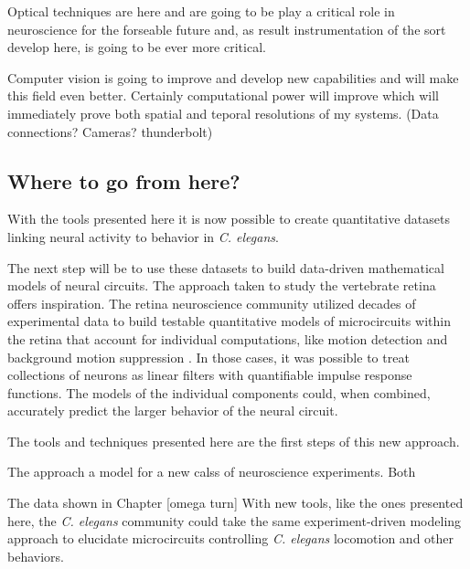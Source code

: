 Optical techniques are here and are going to be play a critical role in neuroscience for the forseable future and, as result instrumentation of the sort develop here, is going to be ever more critical. 








Computer vision is going to improve and develop new capabilities and will make this field even better. Certainly computational power will improve which will immediately prove both spatial and teporal resolutions of my systems. (Data connections? Cameras? thunderbolt)




\subsection*{Where to go from here?}
With the tools presented here it is now possible to  create  quantitative datasets linking neural activity to behavior in \textit{C. elegans}.


 The next step will be to use these datasets to  build data-driven mathematical models of neural circuits. The approach taken to study the vertebrate retina offers inspiration. The retina neuroscience community utilized decades of experimental data to  build  testable quantitative  models of microcircuits within the retina that account for individual computations, like motion detection and background motion suppression \citep{baccus_retinal_2008, gollisch_eye_2010}. In those cases, it was possible to treat collections of neurons as linear filters with quantifiable  impulse response functions. The models of the individual components could, when combined, accurately predict the larger behavior of the neural circuit. 


The tools and techniques presented here are the first steps of this new approach.


The approach a model for a new calss of neuroscience experiments. Both 

 The data shown in Chapter [omega turn] 
With new tools, like the ones presented here,  the \textit{C. elegans} community could take the same experiment-driven modeling approach to elucidate microcircuits controlling \textit{C. elegans} locomotion and other behaviors.





